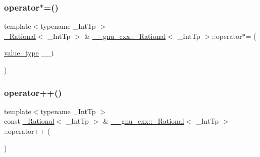 \subsubsection{\texorpdfstring{operator$\ast$=()}{operator*=()}\hspace{0.1cm}{\footnotesize\ttfamily [2/2]}}
{\footnotesize\ttfamily template$<$typename \+\_\+\+Int\+Tp $>$ \\
\hyperlink{class____gnu__cxx_1_1__Rational}{\+\_\+\+Rational}$<$ \+\_\+\+Int\+Tp $>$ \& \hyperlink{class____gnu__cxx_1_1__Rational}{\+\_\+\+\_\+gnu\+\_\+cxx\+::\+\_\+\+Rational}$<$ \+\_\+\+Int\+Tp $>$\+::operator$\ast$= (\begin{DoxyParamCaption}\item[{\hyperlink{class____gnu__cxx_1_1__Rational_a7987be70fc59d0d980621fd65828b74a}{value\+\_\+type}}]{\+\_\+\+\_\+i }\end{DoxyParamCaption})\hspace{0.3cm}{\ttfamily [inline]}}

\mbox{\label{class____gnu__cxx_1_1__Rational_a8e49d1fc21ab7ab83cf1697815482b0f}} 
\subsubsection{\texorpdfstring{operator++()}{operator++()}}
{\footnotesize\ttfamily template$<$typename \+\_\+\+Int\+Tp $>$ \\
const \hyperlink{class____gnu__cxx_1_1__Rational}{\+\_\+\+Rational}$<$ \+\_\+\+Int\+Tp $>$ \& \hyperlink{class____gnu__cxx_1_1__Rational}{\+\_\+\+\_\+gnu\+\_\+cxx\+::\+\_\+\+Rational}$<$ \+\_\+\+Int\+Tp $>$\+::operator++ (\begin{DoxyParamCaption}{ }\end{DoxyParamCaption})\hspace{0.3cm}{\ttfamily [inline]}}

\mbox{\label{class____gnu__cxx_1_1__Rational_a97c9bcfdc0db315e53516efd031c594e}} 
